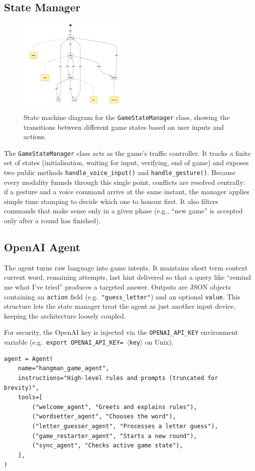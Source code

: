 \subsection*{State Manager}
\begin{figure}
    \centering
    \includegraphics[width=0.5\textwidth]{./images/game_state_manager_state_machine.png}
    \caption{State machine diagram for the \texttt{GameStateManager} class, showing the transitions between different game states based on user inputs and actions.}
    \label{fig:state_machine}
\end{figure}
The \texttt{GameStateManager} class acts as the game’s traffic controller. It tracks a finite set of states (initialisation, waiting for input, verifying, end of game) and exposes two public methods \texttt{handle\_voice\_input()} and \texttt{handle\_gesture()}. Because every modality funnels through this single point, conflicts are resolved centrally: if a gesture and a voice command arrive at the same instant, the manager applies simple time stamping to decide which one to honour first. It also filters commands that make sense only in a given phase (e.g., “new game” is accepted only after a round has finished).

\subsection*{OpenAI Agent}

The agent turns raw language into game intents. It maintains short term context current word, remaining attempts, last hint delivered so that a query like “remind me what I’ve tried” produces a targeted answer.  
Outputs are JSON objects containing an \texttt{action} field (e.g.\ \texttt{"guess\_letter"}) and an optional \texttt{value}.  
This structure lets the state manager treat the agent as just another input device, keeping the architecture loosely coupled.

For security, the OpenAI key is injected via the \texttt{OPENAI\_API\_KEY} environment variable (e.g.\ \texttt{export OPENAI\_API\_KEY=\,$\langle$key$\rangle$} on Unix).

\begin{lstlisting}[style=pystyle,
                   caption={Essential agent scaffold},
                   label={lst:agent}]
agent = Agent(
    name="hangman_game_agent",
    instructions="High-level rules and prompts (truncated for brevity)",
    tools=[
        ("welcome_agent", "Greets and explains rules"),
        ("wordsetter_agent", "Chooses the word"),
        ("letter_guesser_agent", "Processes a letter guess"),
        ("game_restarter_agent", "Starts a new round"),
        ("sync_agent", "Checks active game state"),
    ],
)
\end{lstlisting}
